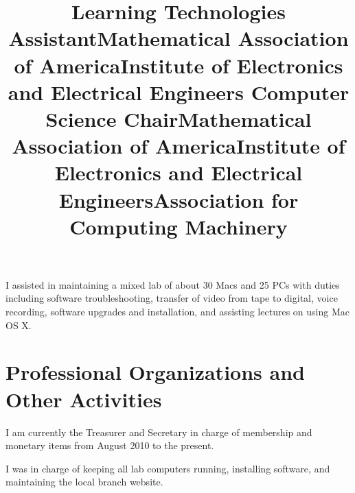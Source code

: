 \documentclass[margintitle,line]{res}
\renewcommand{\subsection}[1]{\section{\normalfont #1}}
\begin{document}
\begin{resume}
\title{Learning Technologies Assistant}
\begin{position}
 I assisted in maintaining a mixed lab of about 30 Macs and 25 PCs with duties including software troubleshooting, transfer of video from tape to digital, voice recording, software upgrades and installation, and assisting lectures on using Mac OS X.
\end{position}




\section{Professional Organizations and Other Activities}

\title{Mathematical Association of America}
\begin{position}
I am currently the Treasurer and Secretary in charge of membership and monetary items from August 2010 to the present.
\end{position}

\title{Institute of Electronics and Electrical Engineers Computer Science Chair}
\begin{position}
I was in charge of keeping all lab computers running, installing software, and maintaining the local branch website.
\end{position}

\title{Mathematical Association of America}
\begin{position}
\end{position}

\title{Institute of Electronics and Electrical Engineers}
\begin{position}
\end{position}

\title{Association for Computing Machinery}
\begin{position}
\end{position}


\end{resume}
\end{document}
